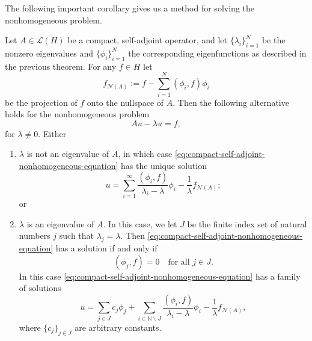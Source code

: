 The following important corollary gives us a method for solving the nonhomogeneous problem.

\begin{Corollary}
\label{cor:compact-self-adjoint-nonhomogeneous-alternative}
Let $A\in\mathcal{L}(H)$ be a compact, self-adjoint operator, and let $\{\lambda_i\}_{i=1}^N$ be the nonzero eigenvalues and $\{\phi_i\}_{i=1}^N$ the corresponding eigenfunctions as described in the previous theorem. For any $f\in H$ let
\begin{equation}\label{eq:hilbert-schmidt-nullspace-data-projection}
f_{\mathcal{N}(A)}:=f-\sum_{i=1}^N(\phi_i,f)\phi_i
\end{equation}
be the projection of $f$ onto the nullspace of $A$. Then the following alternative holds for the nonhomogeneous problem
\begin{equation}\label{eq:compact-self-adjoint-nonhomogeneous-equation}
Au-\lambda u=f,
\end{equation}
for $\lambda\ne0$. Either\begin{enumerate}\item $\lambda$ is not an eigenvalue of $A$, in which case \eqref{eq:compact-self-adjoint-nonhomogeneous-equation} has the unique solution
\begin{equation}\label{eq:compact-self-adjoint-noneigenvalue-unique-solution}
u=\sum_{i=1}^\infty\dfrac{(\phi_i,f)}{\lambda_i-\lambda}\phi_i-\dfrac{1}{\lambda}f_{\mathcal{N}(A)};
\end{equation}
or\item $\lambda$ is an eigenvalue of $A$. In this case, we let $J$ be the finite index set of natural numbers $j$ such that $\lambda_j=\lambda$. Then \eqref{eq:compact-self-adjoint-nonhomogeneous-equation} has a solution if and only if
\begin{equation}\label{eq:compact-self-adjoint-eigenvalue-solvability-condition}
(\phi_j,f)=0\quad\text{for all }j\in J.
\end{equation}
In this case \eqref{eq:compact-self-adjoint-nonhomogeneous-equation} has a family of solutions
\begin{equation}\label{eq:compact-self-adjoint-eigenvalue-solution-family}
u=\sum_{j\in J}c_j\phi_j+\sum_{i\in\mathbb{N}\backslash J}\dfrac{(\phi_i,f)}{\lambda_i-\lambda}\phi_i-\dfrac{1}{\lambda}f_{\mathcal{N}(A)},
\end{equation}
where $\{c_j\}_{j\in J}$ are arbitrary constants.\end{enumerate}
\end{Corollary}

